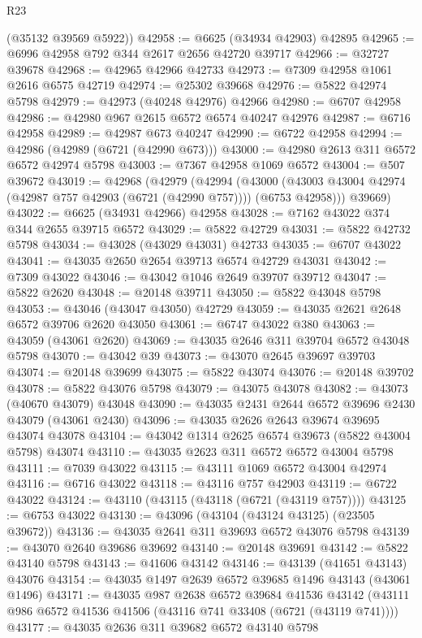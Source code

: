 \begin{lexlean}{R23}
\begin{coremodule}
      (@35132 @39569 @5922))
@42958 := @6625 (@34934 @42903) @42895
@42965 := @6996 @42958 @792 @344 @2617 @2656 @42720 @39717
@42966 := @32727 @39678
@42968 := @42965 @42966 @42733
@42973 := @7309 @42958 @1061 @2616 @6575 @42719
@42974 := @25302 @39668
@42976 := @5822 @42974 @5798
@42979 := @42973 (@40248 @42976) @42966
@42980 := @6707 @42958
@42986 := @42980 @967 @2615 @6572 @6574 @40247 @42976
@42987 := @6716 @42958
@42989 := @42987 @673 @40247
@42990 := @6722 @42958
@42994 := @42986 (@42989 (@6721 (@42990 @673)))
@43000 := @42980 @2613 @311 @6572 @6572 @42974 @5798
@43003 := @7367 @42958 @1069 @6572
@43004 := @507 @39672
@43019 := @42968
    (@42979
      (@42994
        (@43000 (@43003 @43004 @42974 (@42987 @757 @42903 (@6721 (@42990 @757)))) (@6753 @42958)))
      @39669)
@43022 := @6625 (@34931 @42966) @42958
@43028 := @7162 @43022 @374 @344 @2655 @39715 @6572
@43029 := @5822 @42729
@43031 := @5822 @42732 @5798
@43034 := @43028 (@43029 @43031) @42733
@43035 := @6707 @43022
@43041 := @43035 @2650 @2654 @39713 @6574 @42729 @43031
@43042 := @7309 @43022
@43046 := @43042 @1046 @2649 @39707 @39712
@43047 := @5822 @2620
@43048 := @20148 @39711
@43050 := @5822 @43048 @5798
@43053 := @43046 (@43047 @43050) @42729
@43059 := @43035 @2621 @2648 @6572 @39706 @2620 @43050
@43061 := @6747 @43022 @380
@43063 := @43059 (@43061 @2620)
@43069 := @43035 @2646 @311 @39704 @6572 @43048 @5798
@43070 := @43042 @39
@43073 := @43070 @2645 @39697 @39703
@43074 := @20148 @39699
@43075 := @5822 @43074
@43076 := @20148 @39702
@43078 := @5822 @43076 @5798
@43079 := @43075 @43078
@43082 := @43073 (@40670 @43079) @43048
@43090 := @43035 @2431 @2644 @6572 @39696 @2430 @43079 (@43061 @2430)
@43096 := @43035 @2626 @2643 @39674 @39695 @43074 @43078
@43104 := @43042 @1314 @2625 @6574 @39673 (@5822 @43004 @5798) @43074
@43110 := @43035 @2623 @311 @6572 @6572 @43004 @5798
@43111 := @7039 @43022
@43115 := @43111 @1069 @6572 @43004 @42974
@43116 := @6716 @43022
@43118 := @43116 @757 @42903
@43119 := @6722 @43022
@43124 := @43110 (@43115 (@43118 (@6721 (@43119 @757))))
@43125 := @6753 @43022
@43130 := @43096 (@43104 (@43124 @43125) (@23505 @39672))
@43136 := @43035 @2641 @311 @39693 @6572 @43076 @5798
@43139 := @43070 @2640 @39686 @39692
@43140 := @20148 @39691
@43142 := @5822 @43140 @5798
@43143 := @41606 @43142
@43146 := @43139 (@41651 @43143) @43076
@43154 := @43035 @1497 @2639 @6572 @39685 @1496 @43143 (@43061 @1496)
@43171 := @43035
    @987
    @2638
    @6572
    @39684
    @41536
    @43142
    (@43111 @986 @6572 @41536 @41506 (@43116 @741 @33408 (@6721 (@43119 @741))))
@43177 := @43035 @2636 @311 @39682 @6572 @43140 @5798

\end{coremodule}
\end{lexlean}
